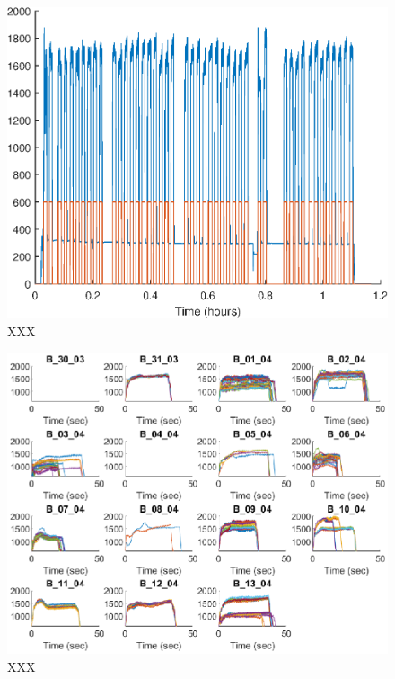 \documentclass{article}
\begin{document}
\begin{figure}[!ht]
    \centering
    \includegraphics[width=\textwidth, height=\textheight, keepaspectratio]{figures/StateDetectionFig_B_02_04.eps}
    \caption{XXX}
    \label{fig:StateDetectionFig_B_02_04}
\end{figure}

\begin{figure}[!ht]
    \centering
    \includegraphics[width=\textwidth, height=\textheight, keepaspectratio]{figures/IdentifiedPulsesFig.eps}
    \caption{XXX}
    \label{fig:IdentifiedPulses}
\end{figure}
\end{document}
